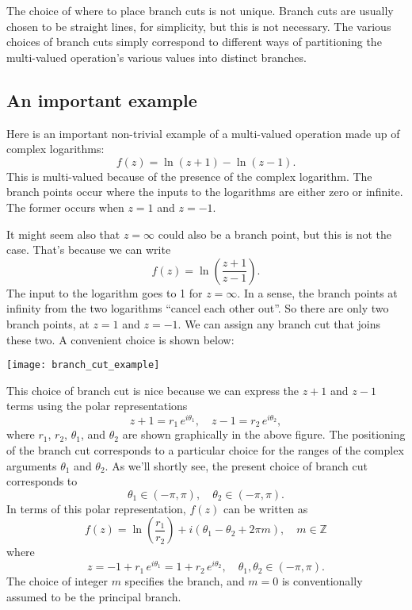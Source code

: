 \documentclass[10pt,a4paper]{article}
\begin{document}
The choice of where to place branch cuts is not unique. Branch cuts are
usually chosen to be straight lines, for simplicity, but this is not
necessary. The various choices of branch cuts simply correspond to
different ways of partitioning the multi-valued operation's various
values into distinct branches.

\subsection{An important example}
\label{an-important-example}

Here is an important non-trivial example of a multi-valued operation
made up of complex logarithms:
\begin{equation}
f(z) = \ln(z+1) - \ln(z-1).
\end{equation}
This is multi-valued because of the presence of the complex logarithm.
The branch points occur where the inputs to the logarithms are either
zero or infinite. The former occurs when $z = 1$ and $z = -1$.

It might seem also that $z = \infty$ could also be a branch point, but
this is not the case.  That's because we can write
\begin{equation}
f(z) = \ln\left(\frac{z+1}{z-1}\right).
\end{equation}
The input to the logarithm goes to 1 for $z = \infty$. In a sense, the
branch points at infinity from the two logarithms ``cancel each other
out''. So there are only two branch points, at $z = 1$ and $z = -1$.
We can assign any branch cut that joins these two. A convenient choice
is shown below:

\begin{center}
  \texttt{[image: branch\_cut\_example]}
\end{center}

This choice of branch cut is nice because we can express the $z+1$ and
$z - 1$ terms using the polar representations
\begin{equation}
  z + 1 = r_1\,e^{i\theta_1}, \quad z - 1 = r_2\, e^{i\theta_2},
\end{equation}
where $r_1$, $r_2$, $\theta_1$, and $\theta_2$ are shown
graphically in the above figure. The positioning of the branch cut
corresponds to a particular choice for the ranges of the complex
arguments $\theta_1$ and $\theta_2$. As we'll shortly see, the
present choice of branch cut corresponds to
\begin{equation}
  \theta_1 \in (-\pi,\pi), \quad \theta_2 \in (-\pi,\pi).
\end{equation}
In terms of this polar representation, $f(z)$ can be written as
\begin{equation}
  f(z) = \ln\left(\frac{r_1}{r_2}\right) + i(\theta_1 - \theta_2 + 2\pi m), \quad m\in\mathbb{Z}
\end{equation}
where
\begin{equation*}
  z = -1 + r_1\,e^{i\theta_1} = 1 + r_2\,e^{i\theta_2},\quad\theta_1, \theta_2 \in (-\pi,\pi).
\end{equation*}
The choice of integer $m$ specifies the branch, and $m = 0$ is
conventionally assumed to be the principal branch.
\end{document}
